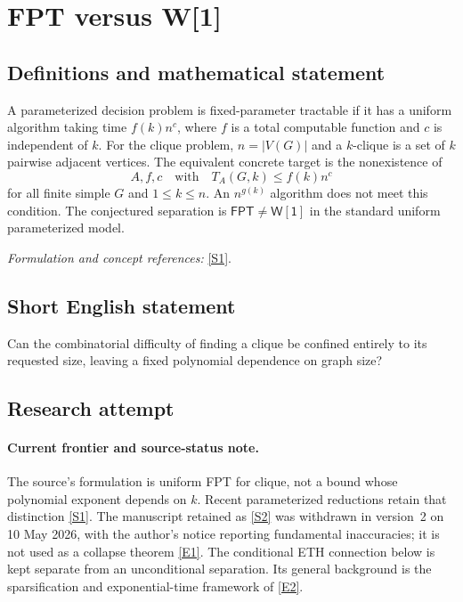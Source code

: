 \documentclass[11pt,a4paper]{article}
\numberwithin{equation}{section}
\newcommand{\sref}[2]{\hyperlink{source:#1:#2}{[S#2]}}
\newcommand{\eref}[2]{\hyperlink{extra:#1:#2}{[E#2]}}
\newif\ifshowcatalogue
\newcommand{\cataloguescope}[1]{\ifshowcatalogue
 \paragraph{Exact scope in the supplied catalogue.}
 \begin{quote}\small #1\end{quote}\fi}
\begin{document}
\setcounter{section}{75}
\section{\texorpdfstring{FPT versus W[1]}{FPT versus W[1]}}\label{76}
\subsection{Definitions and mathematical statement}
A parameterized decision problem is fixed-parameter tractable if it has a uniform algorithm taking time $f(k)n^c$, where $f$ is a total computable function and $c$ is independent of $k$. For the clique problem, $n=|V(G)|$ and a $k$-clique is a set of $k$ pairwise adjacent vertices. The equivalent concrete target is the nonexistence of
\[
 A,f,c\quad\text{with}\quad T_A(G,k)\le f(k)n^c
\]
for all finite simple $G$ and $1\le k\le n$. An $n^{g(k)}$ algorithm does not meet this condition. The conjectured separation is $\mathsf{FPT}\ne\mathsf{W[1]}$ in the standard uniform parameterized model.
\par\smallskip\textit{Formulation and concept references:} \sref{76}{1}.
\cataloguescope{Prove or disprove FPT!=W[1] in classical uniform parameterized complexity. Equivalently, determine whether there is a deterministic algorithm, a total computable function f:N->N and an absolute constant c such that on every finite simple n-vertex graph G and every integer 1<=k<=n it decides the existence of a k-clique within f(k)n\textasciicircum{}c steps. The conjecture asserts no such algorithm. The function and exponent are fixed with the algorithm; no input-length advice, oracle or nonuniform circuit family is allowed.}
\subsection{Short English statement}
Can the combinatorial difficulty of finding a clique be confined entirely to its requested size, leaving a fixed polynomial dependence on graph size?
\subsection{Research attempt}

\paragraph{Current frontier and source-status note.}
The source's formulation is uniform FPT for clique, not a bound whose
polynomial exponent depends on $k$. Recent parameterized reductions retain
that distinction \sref{76}{1}. The manuscript retained as \sref{76}{2}
was withdrawn in version~2 on 10 May 2026, with the author's notice reporting
fundamental inaccuracies; it is not used as a collapse theorem
\eref{76}{1}. The conditional ETH connection below is kept separate from
an unconditional separation. Its general background is the sparsification
and exponential-time framework of \eref{76}{2}.
\end{document}
